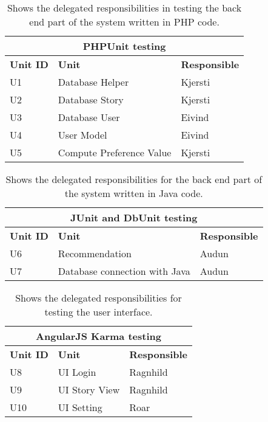 \begin{table}[H]
	\caption{Shows the delegated responsibilities in testing the back end part of the system written in PHP code.}
	\label{Tab:phptesting}
	\begin{center}
		\begin{tabular}{ | l | l | l |}
			\hline
			\multicolumn{3}{|c|}{\textbf{PHPUnit testing}} \\
			\hline
			\textbf{Unit ID} & \textbf{Unit} & \textbf{Responsible} \\ \hline
			U1 & Database Helper & Kjersti \\ \hline
			U2 & Database Story & Kjersti \\ \hline
			U3 & Database User & Eivind \\ \hline
			U4 & User Model & Eivind \\ \hline			
			U5 & Compute Preference Value & Kjersti \\ \hline			
		\end{tabular}
	\end{center}
\end{table}

\begin{table}[H]
		\caption{Shows the delegated responsibilities for the back end part of the system written in Java code.}
		\label{Tab:junittesting}
	\begin{center}
		\begin{tabular}{ | l | l | l |}
			\hline
			\multicolumn{3}{|c|}{\textbf{JUnit and DbUnit testing}} \\
			\hline
			\textbf{Unit ID} & \textbf{Unit} & \textbf{Responsible} \\ \hline
			U6 & Recommendation  & Audun \\ \hline
			U7 & Database connection with Java & Audun \\\hline			
		\end{tabular}
	\end{center}

\end{table}

\begin{table}[H]
	\caption{Shows the delegated responsibilities for testing the user interface.}
	\label{Tab:karmatesting}
	\begin{center}
		\begin{tabular}{ | l | l | l |}
			\hline
			\multicolumn{3}{|c|}{\textbf{AngularJS Karma testing}} \\
			\hline
			\textbf{Unit ID} & \textbf{Unit} & \textbf{Responsible} \\ \hline
			U8 & UI Login & Ragnhild \\ \hline
			U9 & UI Story View & Ragnhild \\ \hline
			U10 & UI Setting & Roar \\ \hline
		\end{tabular}
	\end{center}

\end{table}



